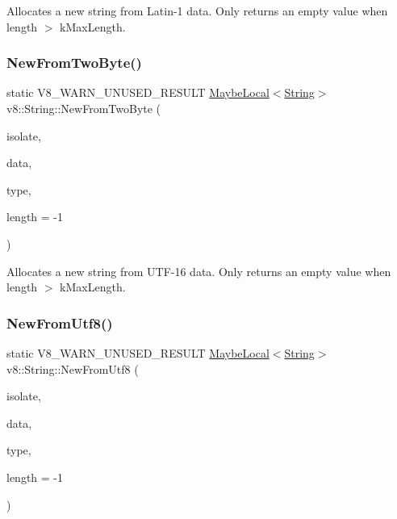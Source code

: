 Allocates a new string from Latin-\/1 data. Only returns an empty value when length $>$ k\+Max\+Length. \mbox{\label{classv8_1_1String_aaad4c7c856c29d79db85994c301fe601}} 
\subsubsection{\texorpdfstring{New\+From\+Two\+Byte()}{NewFromTwoByte()}}
{\footnotesize\ttfamily static V8\+\_\+\+W\+A\+R\+N\+\_\+\+U\+N\+U\+S\+E\+D\+\_\+\+R\+E\+S\+U\+LT \mbox{\hyperlink{classv8_1_1MaybeLocal}{Maybe\+Local}}$<$\mbox{\hyperlink{classv8_1_1String}{String}}$>$ v8\+::\+String\+::\+New\+From\+Two\+Byte (\begin{DoxyParamCaption}\item[{\mbox{\hyperlink{classv8_1_1Isolate}{Isolate}} $\ast$}]{isolate,  }\item[{const uint16\+\_\+t $\ast$}]{data,  }\item[{\mbox{\hyperlink{namespacev8_ac9163ab12fb3b2a95907a3a0367c6095}{v8\+::\+New\+String\+Type}}}]{type,  }\item[{int}]{length = {\ttfamily -\/1} }\end{DoxyParamCaption})\hspace{0.3cm}{\ttfamily [static]}}

Allocates a new string from U\+T\+F-\/16 data. Only returns an empty value when length $>$ k\+Max\+Length. \mbox{\label{classv8_1_1String_a851bcf20fecb01b97f14131ce609f701}} 
\subsubsection{\texorpdfstring{New\+From\+Utf8()}{NewFromUtf8()}}
{\footnotesize\ttfamily static V8\+\_\+\+W\+A\+R\+N\+\_\+\+U\+N\+U\+S\+E\+D\+\_\+\+R\+E\+S\+U\+LT \mbox{\hyperlink{classv8_1_1MaybeLocal}{Maybe\+Local}}$<$\mbox{\hyperlink{classv8_1_1String}{String}}$>$ v8\+::\+String\+::\+New\+From\+Utf8 (\begin{DoxyParamCaption}\item[{\mbox{\hyperlink{classv8_1_1Isolate}{Isolate}} $\ast$}]{isolate,  }\item[{const char $\ast$}]{data,  }\item[{\mbox{\hyperlink{namespacev8_ac9163ab12fb3b2a95907a3a0367c6095}{v8\+::\+New\+String\+Type}}}]{type,  }\item[{int}]{length = {\ttfamily -\/1} }\end{DoxyParamCaption})\hspace{0.3cm}{\ttfamily [static]}}

